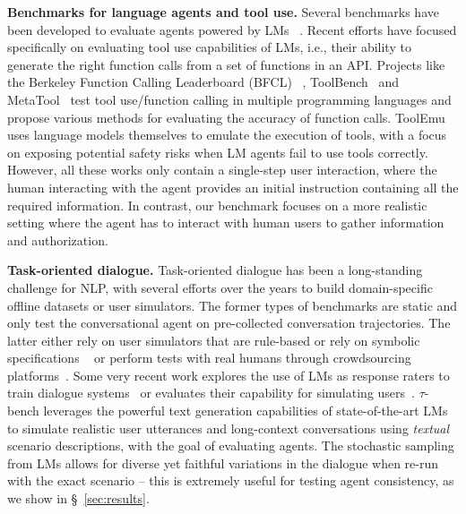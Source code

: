 \documentclass{article}
\newcommand{\benchmark}{$\tau$-bench}
\begin{document}
\textbf{Benchmarks for language agents and tool use.} Several benchmarks have been developed to evaluate agents powered by LMs~\citep{yao2022webshop, zhou2023webarena, jimenez2023swe, liu2023agentbench, ruan2023identifying} . Recent efforts have focused specifically on evaluating tool use capabilities of LMs, i.e., their ability to generate the right function calls from a set of functions in an API. Projects like the Berkeley Function Calling Leaderboard (BFCL) ~\cite{berkeley-function-calling-leaderboard}, ToolBench~\cite{xu2023tool} and MetaTool~\cite{huang2023metatool} test tool use/function calling in multiple programming languages and propose various methods for evaluating the accuracy of function calls. ToolEmu~\cite{ruan2023identifying} uses language models themselves to emulate the execution of tools, with a focus on exposing potential safety risks when LM agents fail to use tools correctly. 
However, all these works only contain a single-step user interaction, where the human interacting with the agent provides an initial instruction containing all the required information. In contrast, our benchmark focuses on a more realistic setting where the agent has to interact with human users to gather information and authorization.

\textbf{Task-oriented dialogue.} Task-oriented dialogue has been a long-standing challenge for NLP, with several efforts over the years to build domain-specific offline datasets or user simulators. The former types of benchmarks are static and only test the conversational agent on pre-collected conversation trajectories\cite{chen2021action, budzianowski2018multiwoz, andreas2020task}. The latter either rely on user simulators that are rule-based or rely on symbolic specifications ~\cite{schatzmann2007evaluating,gur2018hidden} or perform tests with real humans through crowdsourcing platforms~\cite{he2018decoupling}. Some very recent work explores the use of LMs as response raters to train dialogue systems~\cite{Hu_2023} or evaluates their capability for simulating users~\cite{yoon2024evaluating}. \benchmark{} leverages the powerful text generation capabilities of state-of-the-art LMs to simulate realistic user utterances and long-context conversations using \textit{textual} scenario descriptions, with the goal of evaluating agents. The stochastic sampling from LMs allows for diverse yet faithful variations in the dialogue when re-run with the exact scenario -- this is extremely useful for testing agent consistency, as we show in \S~\ref{sec:results}.
\end{document}
